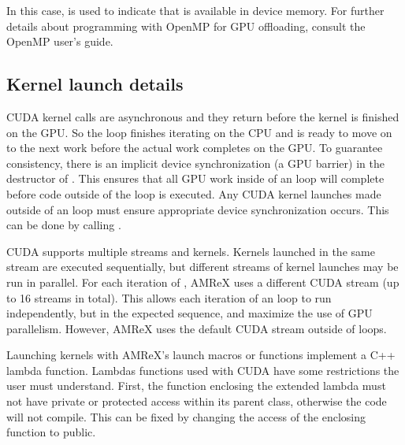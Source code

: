 \documentclass[letterpaper,10pt,english]{sphinxmanual}
\begin{document}
\sphinxAtStartPar
In this case,  is used to indicate that 
is available in device memory. For further details about programming
with OpenMP for GPU offloading, consult the OpenMP user’s guide.


\subsection{Kernel launch details}
\label{\detokenize{GPU:kernel-launch-details}}
\sphinxAtStartPar
CUDA kernel calls are asynchronous and they return before the kernel
is finished on the GPU. So the  loop finishes iterating on
the CPU and is ready to move on to the next work before the actual
work completes on the GPU.  To guarantee consistency,
there is an implicit device synchronization (a GPU barrier) in
the destructor of .  This ensures that all GPU work
inside of an  loop will complete before code outside of
the loop is executed. Any CUDA kernel launches made outside of an
 loop must ensure appropriate device synchronization
occurs. This can be done by calling .

\sphinxAtStartPar
CUDA supports multiple streams and kernels. Kernels launched in the
same stream are executed sequentially, but different streams of kernel
launches may be run in parallel.  For each iteration of ,
AMReX uses a different CUDA stream (up to 16 streams in total).  This
allows each iteration of an  loop to run independently,
but in the expected sequence, and maximize the use of GPU parallelism.
However, AMReX uses the default CUDA stream outside of 
loops.

\sphinxAtStartPar
Launching kernels with AMReX’s launch macros or functions implement
a C++ lambda function. Lambdas functions used with CUDA have some
restrictions the user must understand.  First, the function enclosing the
extended lambda must not have private or protected access within its parent
class,  otherwise the code will not compile.  This can be fixed by changing
the access of the enclosing function to public.
\end{document}
